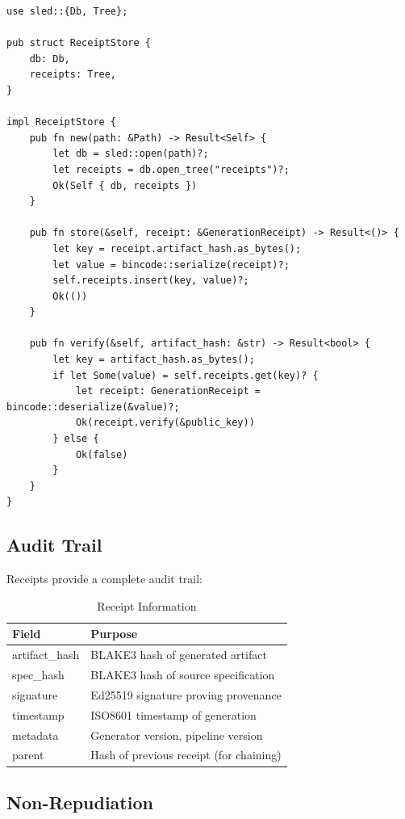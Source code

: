 \begin{verbatim}
use sled::{Db, Tree};

pub struct ReceiptStore {
    db: Db,
    receipts: Tree,
}

impl ReceiptStore {
    pub fn new(path: &Path) -> Result<Self> {
        let db = sled::open(path)?;
        let receipts = db.open_tree("receipts")?;
        Ok(Self { db, receipts })
    }

    pub fn store(&self, receipt: &GenerationReceipt) -> Result<()> {
        let key = receipt.artifact_hash.as_bytes();
        let value = bincode::serialize(receipt)?;
        self.receipts.insert(key, value)?;
        Ok(())
    }

    pub fn verify(&self, artifact_hash: &str) -> Result<bool> {
        let key = artifact_hash.as_bytes();
        if let Some(value) = self.receipts.get(key)? {
            let receipt: GenerationReceipt = bincode::deserialize(&value)?;
            Ok(receipt.verify(&public_key))
        } else {
            Ok(false)
        }
    }
}
\end{verbatim}

\subsection{Audit Trail}

Receipts provide a complete audit trail:

\begin{table}[h]
\centering
\caption{Receipt Information}
\begin{tabular}{ll}
\toprule
\textbf{Field} & \textbf{Purpose} \\
\midrule
artifact\_hash & BLAKE3 hash of generated artifact \\
spec\_hash & BLAKE3 hash of source specification \\
signature & Ed25519 signature proving provenance \\
timestamp & ISO8601 timestamp of generation \\
metadata & Generator version, pipeline version \\
parent & Hash of previous receipt (for chaining) \\
\bottomrule
\end{tabular}
\end{table}

\subsection{Non-Repudiation}

